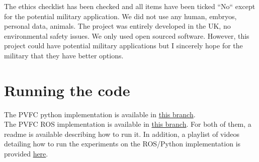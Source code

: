 The ethics checklist has been checked and all items have been ticked ``No`` except for the potential military application.
We did not use any human, embryos, personal data, animals. The project was entirely developed in the UK, no environmental safety issues.
We only used open sourced software.
However, this project could have potential military applications but I sincerely hope for the military that they have better options.

\section{Running the code}
The PVFC python implementation is available in \href{https://github.com/bsbretly/pvfc_sim/tree/devel-beta_error}{this branch}.\\
The PVFC ROS implementation is available in \href{https://github.com/bsbretly/pvfc_ws/tree/jonas-pcl}{this branch}.
For both of them, a readme is available describing how to run it. 
In addition, a playlist of videos detailing how to run the experiments on the ROS/Python implementation is provided \href{https://www.youtube.com/watch?v=tSBsaKx5Zww&list=PLvZGCthLI9WrbS7W-F28ljQfRyHxxw-9p}{here}.